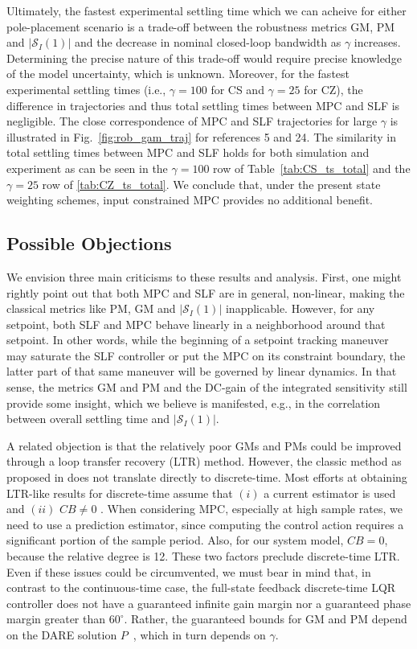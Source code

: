 \documentclass[twocolumn,twoside]{IEEEtran}
\begin{document}
Ultimately, the fastest experimental settling time which we can acheive for either pole-placement scenario is a trade-off between the robustness metrics GM, PM and $|\mathcal{S}_I(1)|$ and the decrease in nominal closed-loop bandwidth as $\gamma$ increases. Determining the precise nature of this trade-off would require precise knowledge of the model uncertainty, which is unknown. Moreover, for the fastest experimental settling times (i.e., ${\gamma=100}$ for CS and ${\gamma=25}$ for CZ), the difference in trajectories and thus total settling times between MPC and SLF is negligible. The close correspondence of MPC and SLF trajectories for large $\gamma$ is illustrated in Fig.~\ref{fig:rob_gam_traj} for references 5 and 24. The similarity in total settling times between MPC and SLF holds for both simulation and experiment as can be seen in the ${\gamma=100}$ row of Table~\ref{tab:CS_ts_total} and the ${\gamma=25}$ row of \ref{tab:CZ_ts_total}. We conclude that, under the present state weighting schemes, input constrained MPC provides no additional benefit.


\subsection{Possible Objections}
We envision three main criticisms to these results and analysis. First, one might rightly point out that both MPC and SLF are in general, non-linear, making the classical metrics like PM, GM and $|\mathcal{S}_I(1)|$ inapplicable. However, for any setpoint, both SLF and MPC behave linearly in a neighborhood around that setpoint. In other words, while the beginning of a setpoint tracking maneuver may saturate the SLF controller or put the MPC on its constraint boundary, the latter part of that same maneuver will be governed by linear dynamics. In that sense, the metrics GM and PM and the DC-gain of the integrated sensitivity still provide some insight, which we believe is manifested, e.g., in the correlation between overall settling time and $|\mathcal{S}_I(1)|$.

A related objection is that the relatively poor GMs and PMs could be improved through a loop transfer recovery (LTR) method. However, the classic method as proposed in \cite{doyle_robustness_1979} does not translate directly to discrete-time. Most efforts at obtaining LTR-like results for discrete-time assume that $(i)$ a current estimator is used and $(ii)$ $CB\neq 0$ \cite{Maciejowski_asymptotic_1985,guaracy_discrete_2015,ishihara_loop_1986}. When considering MPC, especially at high sample rates, we need to use a prediction estimator, since computing the control action requires a significant portion of the sample period. Also, for our system model, $CB=0$, because the relative degree is 12. These two factors preclude discrete-time LTR. Even if these issues could be circumvented, we must bear in mind that, in contrast to the continuous-time case, the full-state feedback discrete-time LQR controller does not have a guaranteed infinite gain margin nor a guaranteed phase margin greater than $60^{\circ}$. Rather, the guaranteed bounds for GM and PM depend on the DARE solution $P$~\cite[p. 136]{andersson_moore}, which in turn depends on $\gamma$. 
\end{document}
